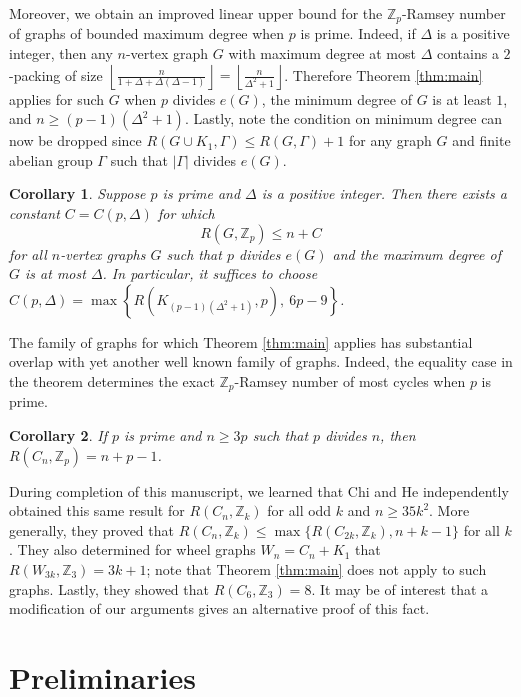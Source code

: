 \documentclass[11pt]{article}
\newcommand{\bZ}{\mathbb{Z}}
\newcommand\set[1]{\left\{ #1 \right\}}
\newcommand\abs[1]{\left\lvert #1 \right\rvert}
\theoremstyle{definition}
\theoremstyle{plain}
\newtheorem{cor}{Corollary}
\begin{document}
Moreover, we obtain an improved linear upper bound for the $\bZ_p$-Ramsey number of graphs of bounded maximum degree when $p$ is prime. Indeed, if $\Delta$ is a positive integer, then any $n$-vertex graph $G$ with maximum degree at most $\Delta$ contains a $2$-packing of size $\left\lfloor\frac{n}{1+\Delta+\Delta(\Delta-1)}\right\rfloor=\left\lfloor\frac{n}{\Delta^2+1}\right\rfloor$. Therefore Theorem \ref{thm:main} applies for such $G$ when $p$ divides $e(G)$, the minimum degree of $G$ is at least $1$, and $n\geq (p-1)(\Delta^2+1)$. Lastly, note the condition on minimum degree can now be dropped since $R(G\cup K_1,\Gamma)\leq R(G,\Gamma)+1$ for any graph $G$ and finite abelian group $\Gamma$ such that $\abs{\Gamma}$ divides $e(G)$.
\begin{cor}
    Suppose $p$ is prime and $\Delta$ is a positive integer. Then there exists a constant $C=C(p,\Delta)$ for which
    \begin{equation*}
        R(G,\bZ_p)\leq n+C
    \end{equation*}
    for all $n$-vertex graphs $G$ such that $p$ divides $e(G)$ and the maximum degree of $G$ is at most $\Delta$. In particular, it suffices to choose $C(p,\Delta)=\max\set{R(K_{(p-1)(\Delta^2+1)},p),\ 6p-9}$.
\end{cor}
The family of graphs for which Theorem \ref{thm:main} applies has substantial overlap with yet another well known family of graphs. Indeed, the equality case in the theorem determines the exact $\bZ_p$-Ramsey number of most cycles when $p$ is prime.
\begin{cor}
    If $p$ is prime and $n\geq 3p$ such that $p$ divides $n$, then $R(C_n,\bZ_p)=n+p-1$.
\end{cor}

During completion of this manuscript, we learned that Chi and He \cite{CH} independently obtained this same result for $R(C_n,\bZ_k)$ for all odd $k$ and $n\geq 35k^2$. More generally, they proved that $R(C_n,\bZ_k)\leq \max\{R(C_{2k},\bZ_k),n+k-1\}$ for all $k$. They also determined for wheel graphs $W_n=C_n+K_1$ that $R(W_{3k},\bZ_3)=3k+1$; note that Theorem \ref{thm:main} does not apply to such graphs. Lastly, they showed that $R(C_6,\bZ_3)=8$. It may be of interest that a modification of our arguments gives an alternative proof of this fact.

\section{Preliminaries}
\end{document}
